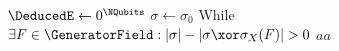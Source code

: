 \begin{algorithm}
	\caption{$\texttt{probabilistic-set-flip($E$)}$}\label{alg:two}
	$\DeducedE \gets 0^{\NQubits}$\;
	$\sigma \gets \sigma_0$\;
		While{$\exists F \in \GeneratorField: |\sigma| - |\sigma \xor \sigma_X(F)| > 0$}{
		$aa$
	}
	\end{algorithm}